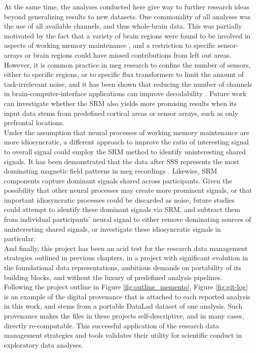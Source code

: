 At the same time, the analyses conducted here give way to further research ideas beyond generalizing results to new datasets.
One commonality of all analyses was the use of all available channels, and thus whole-brain data.
This was partially motivated by the fact that a variety of brain regions were found to be involved in aspects of working memory maintenance \citet{sreenivasan2019and}, and a restriction to specific sensor-arrays or brain regions could have missed contributions from left out areas.
However, it is common practice in \gls{meg} research to confine the number of sensors, either to specific regions, or to specific flux transformers \citep{garces2017choice} to limit the amount of task-irrelevant noise, and it has been shown that reducing the number of channels in brain-computer-interface applications can improve decodability \citep{roy2020assessing}.
Future work can investigate whether the \gls{SRM} also yields more promising results when its input data stems from predefined cortical areas or sensor arrays, such as only prefrontal locations.\\
Under the assumption that neural processes of working memory maintenance are more idiosyncratic, a different approach to improve the ratio of interesting signal to overall signal could employ the \gls{SRM} method to identify uninteresting shared signals.
It has been demonstrated that the data after \gls{SSS} represents the most dominating magnetic field patterns in \gls{meg} recordings \citep{garces2017choice}.
Likewise, \gls{SRM} components capture dominant signals shared across participants.
Given the possibility that other neural processes may create more prominent signals, or that important idiosyncratic processes could be discarded as noise, future studies could attempt to identify these dominant signals via \gls{SRM}, and subtract them from individual participants' neural signal to either remove dominating sources of uninteresting shared signals, or investigate these idiosyncratic signals in particular.\\
And finally, this project has been an acid test for the research data management strategies outlined in previous chapters, in a project with significant evolution in the foundational data representations, ambitious demands on portability of its building blocks, and without the luxury of predefined analysis pipelines.
Following the project outline in Figure \ref{fig:outline_memento}, Figure \ref{fig:git-log} is an example of the digital provenance that is attached to each reported analysis in this work, and stems from a portable DataLad dataset of one analysis.
Such provenance makes the files in these projects self-descriptive, and in many cases, directly re-computable.
This successful application of the research data management strategies and tools validates their utility for scientific conduct in exploratory data analyses.\\

